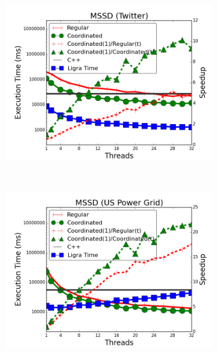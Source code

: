 \begin{figure}[]
\begin{subfigure}[b]{\plotsize\textwidth}
        \end{subfigure} \\
        \begin{subfigure}[b]{\plotsize\textwidth}
                \includegraphics[width=\textwidth]{experiments/coordination/cmp-shortest-twitter.png}
                \label{fig:coordination:coord_sssp_twitter}
        \end{subfigure}
        ~
        \begin{subfigure}[b]{\plotsize\textwidth}
                \includegraphics[width=\textwidth]{experiments/coordination/cmp-shortest-uspowergrid.png}

\end{subfigure}
\end{figure}
